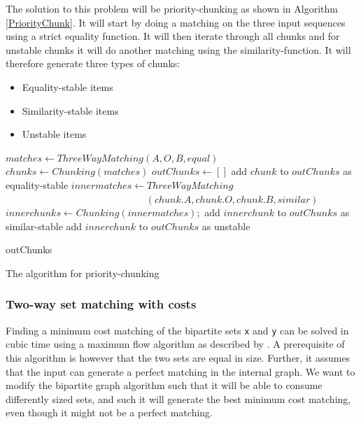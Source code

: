 \documentclass[11pt]{article}
\begin{document}
The solution to this problem will be priority-chunking as shown in Algorithm \ref{PriorityChunk}. It will start by doing a matching on the three input sequences using a strict equality function. It will then iterate through all chunks and for unstable chunks it will do another matching using the similarity-function. It will therefore generate three types of chunks:

\begin{itemize}
   \item Equality-stable items
   \item Similarity-stable items
   \item Unstable items
\end{itemize}

\begin{algorithm}
\begin{algorithmic}
	\State $matches \gets ThreeWayMatching(A, O, B, equal)$
	\State $chunks \gets Chunking(matches)$
	\State $outChunks \gets []$
			\State add $chunk$ to $outChunks$ as equality-stable
		\Else
			\State $innermatches \gets ThreeWayMatching $
			\State ~~~~~~~~~~~~~~~~~~~~~~~~~~~~ $ (chunk.A, chunk.O, chunk.B, similar)$
            \State $innerchunks \gets Chunking(innermatches);$
					\State add $innerchunk$ to $outChunks$ as similar-stable
				\Else
					\State add $innerchunk$ to $outChunks$ as unstable
				\EndIf
			\EndFor
		\EndIf
	\EndFor


	\State \Return outChunks
\EndFunction
\end{algorithmic}
	\caption{The algorithm for priority-chunking}
	\label{PriorityChunk}
\end{algorithm}


\subsubsection{Two-way set matching with costs}
Finding a minimum cost matching of the bipartite sets \texttt{x} and \texttt{y} can be solved in cubic time using a maximum flow algorithm as described by \citet{bipartitecost}. A prerequisite of this algorithm is however that the two sets are equal in size. Further, it assumes that the input can generate a perfect matching in the internal graph. We want to modify the bipartite graph algorithm such that it will be able to consume differently sized sets, and such it will generate the best minimum cost matching, even though it might not be a perfect matching.
\end{document}
